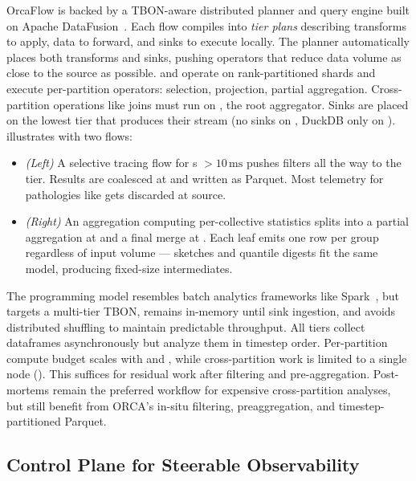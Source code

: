 OrcaFlow is backed by a TBON-aware distributed planner and query engine built on Apache
DataFusion~\cite{Lamb2024:DataFusion}.
Each flow compiles into \emph{tier plans} describing transforms to apply, data to forward, and
sinks to execute locally.
The planner automatically places both transforms and sinks, pushing operators that reduce data
volume as close to the source as possible.
\tiermpi{} and \tieragg{} operate on rank-partitioned shards and execute per-partition operators:
selection, projection, partial aggregation.
Cross-partition operations like joins must run on \tierctl{}, the root aggregator.
Sinks are placed on the lowest tier that produces their stream (no sinks on \tiermpi{}, DuckDB only
on \tierctl{}).
 illustrates with two flows:

\begin{itemize}[leftmargin=*]
  \item \emph{(Left)}
        A selective tracing flow for \mpiw{}s $> 10\,\text{ms}$ pushes filters all the way to the
        \tiermpi{} tier.
        Results are coalesced at \tieragg{} and written as Parquet.
        Most telemetry for pathologies like  gets discarded at source.
  \item \emph{(Right)}
        An aggregation computing per-collective statistics splits into a partial aggregation at \tiermpi{}
        and a final merge at \tierctl{}.
        Each leaf emits one row per group regardless of input volume --- sketches and quantile digests fit
        the same model, producing fixed-size intermediates.
\end{itemize}

The programming model resembles batch analytics frameworks like Spark~\cite{Zahar2010:Spark}, but
targets a multi-tier TBON, remains in-memory until sink ingestion, and avoids distributed shuffling
to maintain predictable throughput.
All tiers collect dataframes asynchronously but analyze them in timestep order.
Per-partition compute budget scales with \tiermpi{} and \tieragg{}, while cross-partition work is
limited to a single node (\tierctl{}).
This suffices for residual work after filtering and pre-aggregation.
Post-mortems remain the preferred workflow for expensive cross-partition analyses, but still
benefit from ORCA's in-situ filtering, preaggregation, and timestep-partitioned Parquet.


\subsection{Control Plane for Steerable Observability}
\label{sec:orca:des_ctl}

